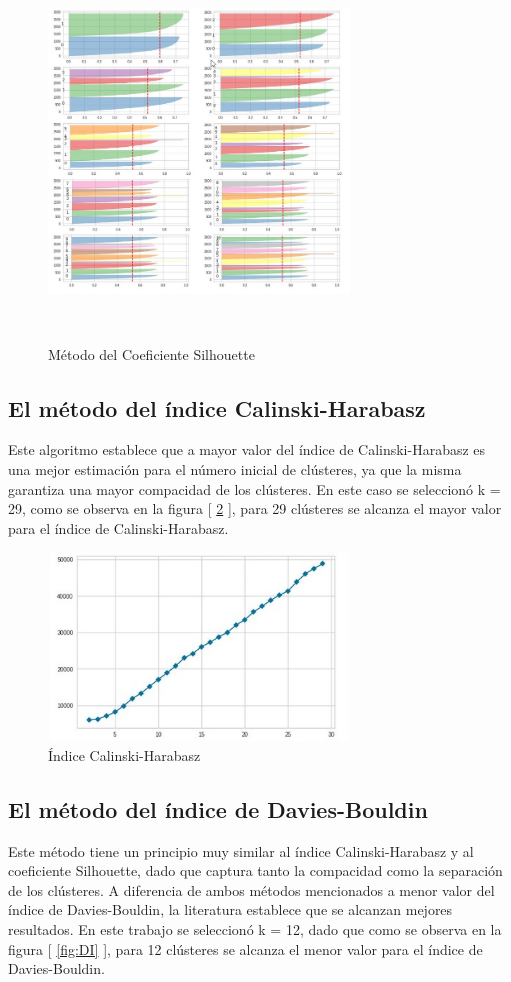 \begin{figure}[h!]
	\centering
	\includegraphics[width=8cm, height=10cm]{Images/SCoe2.jpg} 
	\caption{Método del Coeficiente Silhouette}
	\label{fig:SCoe2}
\end{figure}
\subsection{El método del índice Calinski-Harabasz}
Este algoritmo establece que a mayor valor del índice de Calinski-Harabasz es una mejor estimación para el número inicial de clústeres, ya que la misma garantiza una mayor compacidad de los clústeres. En este caso se seleccionó k = 29, como se observa en la figura [ \ref*{fig:CI} ], para 29 clústeres se alcanza el mayor valor para el índice de Calinski-Harabasz.


\begin{figure}[h!]
	\centering
	\includegraphics[width=8cm, height=5cm]{Images/CIndex.jpg} 
	\caption{Índice Calinski-Harabasz}
	\label{fig:CI}
\end{figure}
\subsection{El método del índice de Davies-Bouldin}
Este método tiene un principio muy similar al índice Calinski-Harabasz y al coeficiente Silhouette, dado que captura tanto la compacidad como la separación de los clústeres. A diferencia de ambos métodos mencionados a menor valor del índice de Davies-Bouldin, la literatura establece que se alcanzan mejores resultados. En este trabajo se seleccionó k = 12, dado que como se observa en la figura [ \ref{fig:DI} ], para 12 clústeres se alcanza el menor valor para el índice de Davies-Bouldin.

